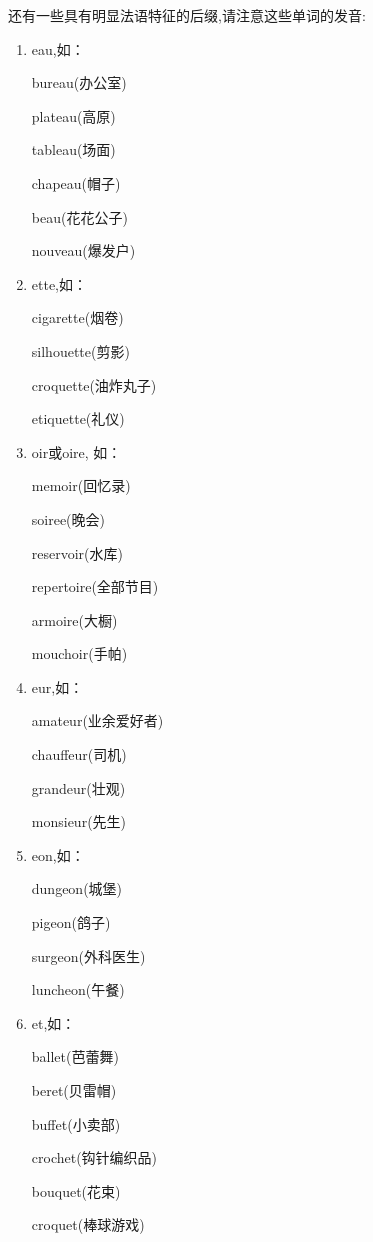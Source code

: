 还有一些具有明显法语特征的后缀,请注意这些单词的发音:
\begin{multicols}{3}
	\begin{enumerate}
		\setlength{\parsep}{0ex}
		\item eau,如：
		
		bureau(办公室)
		
		plateau(高原)
		
		tableau(场面)
		
		chapeau(帽子)
		
		beau(花花公子)
		
		nouveau(爆发户)
		
		\item ette,如：
		
		cigarette(烟卷)

		silhouette(剪影)
		
		croquette(油炸丸子)
		
		etiquette(礼仪)

		\item oir或oire, 如：
		
		memoir(回忆录)

		soiree(晚会)
		
		reservoir(水库)
		
		repertoire(全部节目)
		
		armoire(大橱)
		
		mouchoir(手帕)
		
		\item eur,如：
		
		amateur(业余爱好者)

		chauffeur(司机)
		
		grandeur(壮观)
		
		monsieur(先生)

		\item eon,如：
		
		dungeon(城堡)

		pigeon(鸽子)
		
		surgeon(外科医生)
		
		luncheon(午餐)
		
		\item et,如：
		
		ballet(芭蕾舞)

		beret(贝雷帽)
		
		buffet(小卖部)
		
		crochet(钩针编织品)
		
		bouquet(花束)
		
		croquet(棒球游戏)
		

\end{enumerate}
\end{multicols}
